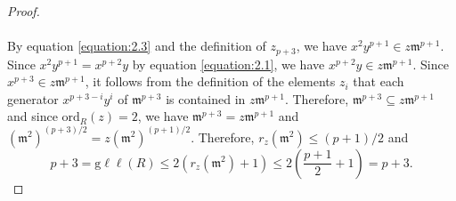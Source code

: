 \documentclass{amsart}
\theoremstyle{definition}
\theoremstyle{definition}
\numberwithin{equation}{section}
\theoremstyle{definition}
\begin{document}
{\begin{proof}
\begin{equation}
\end{equation} \text{}\\ By equation \ref{equation:2.3} and the definition of $z_{p+3}$, we have $x^{2}y^{p+1} \in z \mathfrak{m}^{p+1}$. Since $x^{2}y^{p+1}=x^{p+2}y$ by equation \ref{equation:2.1}, we have $x^{p+2}y \in z \mathfrak{m}^{p+1}$. Since $x^{p+3} \in z \mathfrak{m}^{p+1}$, it follows from the definition of the elements $z_i$ that each generator $x^{p+3-i}y^i$ of $\mathfrak{m}^{p+3}$ is contained in $z \mathfrak{m}^{p+1}$. Therefore, $\mathfrak{m}^{p+3} \subseteq z \mathfrak{m}^{p+1}$ and since $\text{ord}_{R}(z)=2$, we have $\mathfrak{m}^{p+3}=z \mathfrak{m}^{p+1}$ and ${(\mathfrak{m}^2)}^{(p+3)/2}=z{(\mathfrak{m}^2)}^{(p+1)/2}$. Therefore, $r_{z}(\mathfrak{m}^2) \leq (p+1)/2$ and \\
\[
p+3 = \text{g}\ell\ell(R) \leq 2(r_{z}(\mathfrak{m}^2)+1) \leq 2\left(\dfrac{p+1}{2}+1\right)=p+3.
\]
\end{proof}
\text{}\\

}
\end{document}
